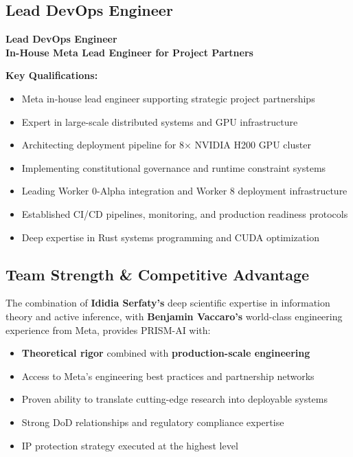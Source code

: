\documentclass[11pt,letterpaper]{article}
\begin{document}
\subsection{Lead DevOps Engineer}

\begin{tcolorbox}[colback=lightgray,colframe=primaryblue,title=Benjamin Vaccaro]
\textbf{Lead DevOps Engineer}\\
\textbf{In-House Meta Lead Engineer for Project Partners}

\vspace{0.3cm}
\textbf{Key Qualifications:}
\begin{itemize}[leftmargin=*]
    \item Meta in-house lead engineer supporting strategic project partnerships
    \item Expert in large-scale distributed systems and GPU infrastructure
    \item Architecting deployment pipeline for 8× NVIDIA H200 GPU cluster
    \item Implementing constitutional governance and runtime constraint systems
    \item Leading Worker 0-Alpha integration and Worker 8 deployment infrastructure
    \item Established CI/CD pipelines, monitoring, and production readiness protocols
    \item Deep expertise in Rust systems programming and CUDA optimization
\end{itemize}
\end{tcolorbox}

\subsection{Team Strength \& Competitive Advantage}

The combination of \textbf{Ididia Serfaty's} deep scientific expertise in information theory and active inference, with \textbf{Benjamin Vaccaro's} world-class engineering experience from Meta, provides PRISM-AI with:

\begin{itemize}
    \item \textbf{Theoretical rigor} combined with \textbf{production-scale engineering}
    \item Access to Meta's engineering best practices and partnership networks
    \item Proven ability to translate cutting-edge research into deployable systems
    \item Strong DoD relationships and regulatory compliance expertise
    \item IP protection strategy executed at the highest level
\end{itemize}
\end{document}
